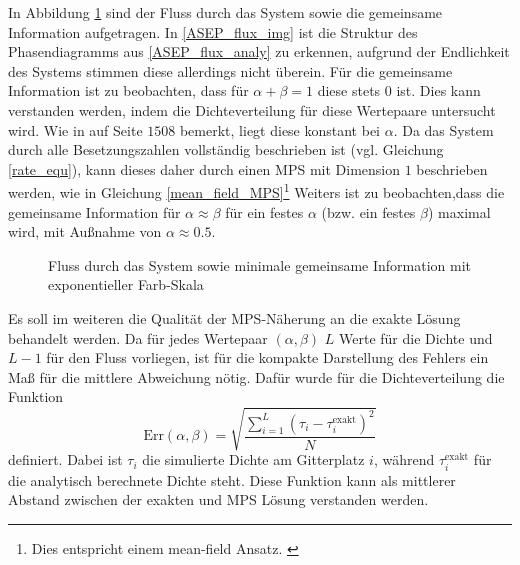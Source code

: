 \documentclass[10pt,a4paper]{report}
\begin{document}
In Abbildung \ref{ASEP_flux&info_img} sind der Fluss durch das System sowie die gemeinsame Information aufgetragen. In \ref{ASEP_flux_img} ist die Struktur des Phasendiagramms aus \ref{ASEP_flux_analy} zu erkennen, aufgrund der Endlichkeit des Systems stimmen diese allerdings nicht überein. 
Für die gemeinsame Information ist zu beobachten, dass für $\alpha+\beta=1$ diese stets $0$ ist. Dies kann verstanden werden, indem die Dichteverteilung für diese Wertepaare untersucht wird. Wie in \cite{ASEP} auf Seite $1508$ bemerkt, liegt diese konstant bei $\alpha$. Da das System durch alle Besetzungszahlen vollständig beschrieben ist (vgl. Gleichung \ref{rate_equ}), kann dieses daher durch einen MPS mit Dimension $1$ beschrieben werden, wie in Gleichung \ref{mean_field_MPS}\footnote{Dies entspricht einem mean-field Ansatz. \cite{Area_law}} Weiters ist zu beobachten,dass die gemeinsame Information für $\alpha\approx\beta$ für ein festes $\alpha$ (bzw. ein festes $\beta$) maximal wird, mit Außnahme von $\alpha\approx0.5$.\\

\begin{figure}
\centering
{}
\label{ASEP_flux&info_img}
\caption{Fluss durch das System sowie minimale gemeinsame Information mit exponentieller Farb-Skala}
\end{figure}



Es soll im weiteren die Qualität der MPS-Näherung an die exakte Lösung behandelt werden. Da für jedes Wertepaar $(\alpha,\beta)$ $L$ Werte für die Dichte und $L-1$ für den Fluss vorliegen, ist für die kompakte Darstellung des Fehlers ein Maß für die mittlere Abweichung nötig. Dafür wurde für die Dichteverteilung die Funktion
\begin{equation}
\text{Err}(\alpha,\beta)=\sqrt{\frac{\sum_{i=1}^L (\tau_i-\tau_i^{\text{exakt}})^2}{N}}
\end{equation}
definiert. Dabei ist $\tau_i$ die simulierte Dichte am Gitterplatz $i$, während $\tau_i^{\text{exakt}}$ für die analytisch berechnete Dichte steht. Diese Funktion kann als mittlerer Abstand zwischen der exakten und MPS Lösung verstanden werden.
\end{document}
